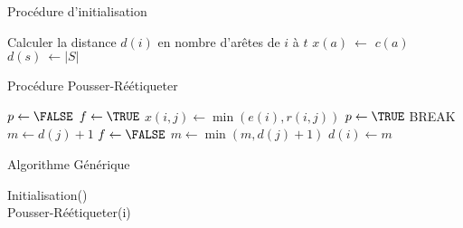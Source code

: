 \begin{algorithm}
	\caption{Procédure d'initialisation}
	\label{proc_init}
	\begin{algorithmic}[1]
				\STATE Calculer la distance $d(i)$ en nombre d'arêtes de $i$ à $t$  
			\ENDFOR
				\STATE $x(a)\ \leftarrow$ $c(a)$  
			\ENDFOR
			\STATE $d(s)\ \leftarrow |S|$ 
	\end{algorithmic}
\end{algorithm}
\begin{algorithm}
	\caption{Procédure Pousser-Réétiqueter}
	\label{proc_pousreet}
	\begin{algorithmic}[1]
			\STATE $p \leftarrow \FALSE$ 
			\STATE $f \leftarrow \TRUE$  
					\STATE $x(i,j) \leftarrow \min(e(i), r(i,j))$  
					\STATE $p \leftarrow \TRUE$ 
					\STATE BREAK
						\STATE $m \leftarrow d(j) + 1$ 
						\STATE $f \leftarrow \FALSE $
						\STATE $m \leftarrow \min(m, d(j) + 1) $
					\ENDIF
				\ENDIF
			\ENDFOR
				\STATE $d(i) \leftarrow m$ 
			\ENDIF
		\end{algorithmic}
\end{algorithm}
\begin{algorithm}
	\caption{Algorithme Générique}
	\label{algo_generic}
	\begin{algorithmic}[1]
			\STATE Initialisation() \\
				\STATE Pousser-Réétiqueter(i) 
			\ENDWHILE
	\end{algorithmic}
\end{algorithm}

